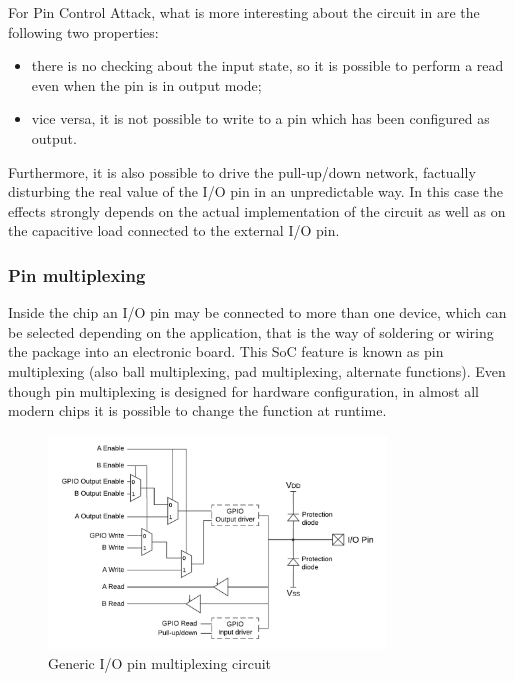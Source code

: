 For Pin Control Attack, what is more interesting about the circuit in \myfig{\ref{fig:pinconf}} are the following two properties:
\begin{itemize}
	\item there is no checking about the input state, so it is possible to perform a read even when the pin is in output mode;
	\item vice versa, it is not possible to write to a pin which has been configured as output.
\end{itemize}

Furthermore, it is also possible to drive the pull-up/down network, factually disturbing the real value of the I/O pin in an unpredictable way.
In this case the effects strongly depends on the actual implementation of the circuit as well as on the capacitive load connected to the external I/O pin.


\subsubsection{Pin multiplexing}

Inside the chip an I/O pin may be connected to more than one device, which can be selected depending on the application,
that is the way of soldering or wiring the package into an electronic board.
This SoC feature is known as pin multiplexing (also ball multiplexing, pad multiplexing, alternate functions).
Even though pin multiplexing is designed for hardware configuration, in almost all modern chips it is possible to change the function at runtime.

\begin{figure}[h]
\centerline{\includegraphics[width=0.8\textwidth]{res/pinmux}}
\caption{Generic I/O pin multiplexing circuit \label{fig:pinmux}}
\end{figure}

